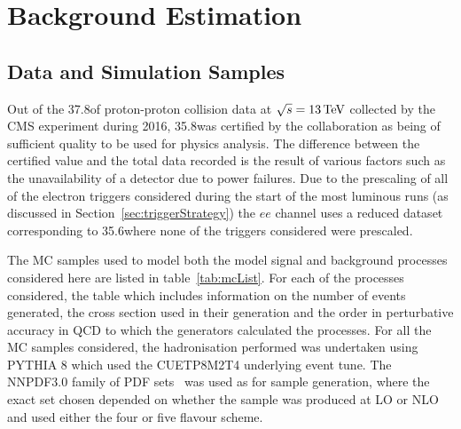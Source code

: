 \chapter{Background Estimation}\label{chapter:bkg}
%
%
%
%

\section{Data and Simulation Samples}\label{sec:samples}
Out of the 37.8\fbinv of  proton-proton collision data at $\sqrt{s} = 13\,\text{Te\hspace{-.08em}V}$ collected by the CMS experiment during 2016, 35.8\fbinv was certified by the collaboration as being of sufficient quality to be used for physics analysis.
The difference between the certified value and the total data recorded is the result of various factors such as the unavailability of a detector due to power failures.
Due to the prescaling of all of the electron triggers considered during the start of the most luminous runs (as discussed in Section~\ref{sec:triggerStrategy}) the $ee$ channel uses a reduced dataset corresponding to 35.6\fbinv where none of the triggers considered were prescaled.

The MC samples used to model both the model signal and background processes considered here are listed in table~\ref{tab:mcList}.
For each of the processes considered, the table which includes information on the number of events generated, the cross section used in their generation and the order in perturbative accuracy in QCD to which the generators calculated the processes.
For all the MC samples considered, the hadronisation performed was undertaken using PYTHIA 8 which used the CUETP8M2T4 underlying event tune.
The NNPDF3.0 family of PDF sets~\cite{Ball:2012cx} was used as for sample generation, where the exact set chosen depended on whether the sample was produced at LO or NLO and used either the four or five flavour scheme.


